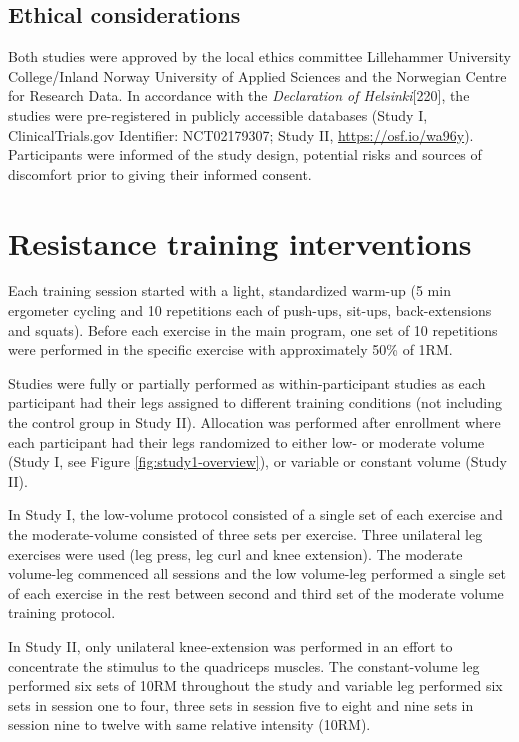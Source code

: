 \documentclass[twoside,10pt]{gihclass} %
\begin{document}
\hypertarget{ethical-considerations}{%
\subsection{Ethical considerations}\label{ethical-considerations}}

Both studies were approved by the local ethics committee Lillehammer
University College/Inland Norway University of Applied Sciences and the
Norwegian Centre for Research Data. In accordance with the \emph{Declaration
of Helsinki}{[}220{]}, the studies were pre-registered in publicly
accessible databases (Study I, ClinicalTrials.gov Identifier:
NCT02179307; Study II, \url{https://osf.io/wa96y}). Participants were
informed of the study design, potential risks and sources of discomfort
prior to giving their informed consent.

\hypertarget{resistance-training-interventions}{%
\section{Resistance training interventions}\label{resistance-training-interventions}}

Each training session started with a light, standardized warm-up (5 min
ergometer cycling and 10 repetitions each of push-ups, sit-ups,
back-extensions and squats). Before each exercise in the main program,
one set of 10 repetitions were performed in the specific exercise with
approximately 50\% of 1RM.

Studies were fully or partially performed as within-participant studies
as each participant had their legs assigned to different training
conditions (not including the control group in Study II). Allocation was
performed after enrollment where each participant had their legs
randomized to either low- or moderate volume (Study I, see Figure \ref{fig:study1-overview}), or variable or
constant volume (Study II).

In Study I, the low-volume protocol consisted of a single set of each
exercise and the moderate-volume consisted of three sets per exercise.
Three unilateral leg exercises were used (leg press, leg curl and knee
extension). The moderate volume-leg commenced all sessions and the low
volume-leg performed a single set of each exercise in the rest between
second and third set of the moderate volume training protocol.

In Study II, only unilateral knee-extension was performed in an effort
to concentrate the stimulus to the quadriceps
muscles. The constant-volume leg performed six sets
of 10RM throughout the study and variable leg performed six sets in
session one to four, three sets in session five to eight and nine sets
in session nine to twelve with same relative intensity (10RM).
\end{document}
